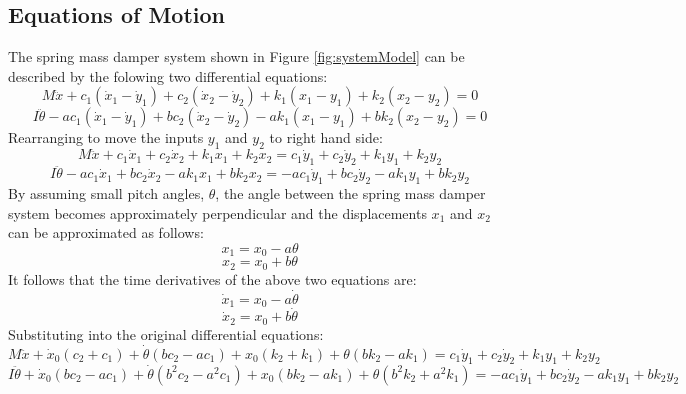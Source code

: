 \documentclass[12pt]{article}
\begin{document}
\subsection{Equations of Motion}
The spring mass damper system shown in Figure \ref{fig:systemModel} can be described by the folowing two differential equations: 
\begin{equation}
	M \ddot x + c_1(\dot x_1 - \dot y_1) + c_2(\dot x_2 - \dot y_2) + k_1(x_1 - y_1) + k_2(x_2 - y_2) = 0
\end{equation}
\begin{equation}
	I \ddot\theta - ac_1(\dot x_1 - \dot y_1) + bc_2(\dot x_2 - \dot y_2) - ak_1(x_1 - y_1) + bk_2(x_2 - y_2) = 0
\end{equation}
Rearranging to move the inputs $y_1$ and $y_2$ to right hand side: 
\begin{equation}
	M \ddot x + c_1\dot x_1 + c_2\dot x_2 + k_1x_1 + k_2x_2 = c_1\dot y_1 + c_2\dot y_2 + k_1y_1 + k_2y_2
\end{equation}
\begin{equation}
	I \ddot\theta - ac_1\dot x_1 + bc_2\dot x_2 - ak_1x_1 + bk_2x_2 = -ac_1\dot y_1 + bc_2\dot y_2 - ak_1y_1 + bk_2y_2
\end{equation}
By assuming small pitch angles, $\theta$, the angle between the spring mass damper system becomes approximately perpendicular and the displacements $x_1$ and $x_2$ can be approximated as follows:
\begin{equation}
	x_1 = x_0 - a\theta
\end{equation}
\begin{equation}
	x_2 = x_0 + b\theta
\end{equation}
It follows that the time derivatives of the above two equations are: 
\begin{equation}
	\dot x_1 = x_0 - a\dot\theta
\end{equation}
\begin{equation}
	\dot x_2 = x_0 + b\dot\theta
\end{equation}
Substituting into the original differential equations: 
\begin{equation}
	M \ddot x + \dot x_0(c_2+c_1) + \dot\theta(bc_2-ac_1) + x_0(k_2+k_1) + \theta(bk_2-ak_1)= c_1\dot y_1 + c_2\dot y_2 + k_1y_1 + k_2y_2
\end{equation}
\begin{equation}
	I \ddot\theta + \dot x_0(bc_2-ac_1) + \dot\theta(b^2c_2-a^2c_1) + x_0(bk_2-ak_1) + \theta(b^2k_2+a^2k_1) = -ac_1\dot y_1 + bc_2\dot y_2 - ak_1y_1 + bk_2y_2
\end{equation}
\end{document}
